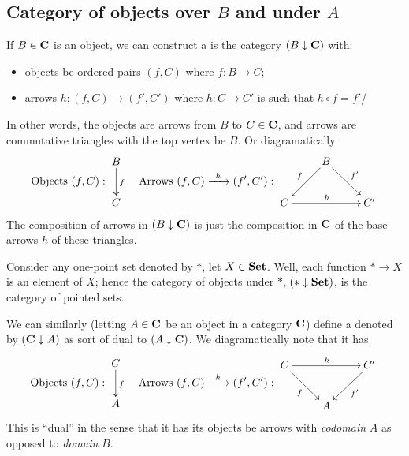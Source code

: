 
\subsection{Category of objects over $B$ and under $A$}
If $B\in\mathbf{C}$ is an object, we can construct a 
is the category $(B\downarrow{}\mathbf{C})$ with:
\begin{itemize}
\item objects be ordered pairs $(f,C)$ where $f:B\to{}C$;
\item arrows $h:(f,C)\to(f',C')$ where $h:C\to{}C'$ is such that $h\circ{}f=f'$/
\end{itemize}
In other words, the objects are arrows from $B$ to $C\in\mathbf{C}$,
and arrows are commutative triangles with the top vertex be
$B$. Or diagramatically
\begin{equation}%
\text{Objects }(f,C):\vcenter{\xymatrix{
B\ar[d]^{f}\\
C
}}\quad
\text{Arrows }(f,C)\xrightarrow{\;\;h\;\;}(f',C'):
\vcenter{\xymatrix{
& \ar[dl]_{f}B\ar[dr]^{f'}&\\
C\ar[rr]^{h}&&C'
}}
\end{equation}
The composition of arrows in $(B\downarrow\mathbf{C})$ is just the
composition in $\mathbf{C}$ of the base arrows $h$ of these triangles.

\begin{ex}
Consider any one-point set denoted by $*$, let
$X\in\mathbf{Set}$. Well, each function $*\to{}X$ is an element of
$X$; hence the category of objects under $*$,
$(*\downarrow\mathbf{Set})$, is the category of pointed sets.
\end{ex}

We can similarly (letting $A\in\mathbf{C}$ be an object in a category
$\mathbf{C}$) define a  denoted
by $(\mathbf{C}\downarrow{}A)$ as sort of dual to
$(A\downarrow\mathbf{C})$. We diagramatically note that it has
\begin{equation}%
\text{Objects }(f,C):\vcenter{\xymatrix{
C\ar[d]^{f}\\
A
}}\quad
\text{Arrows }(f,C)\xrightarrow{\;\;h\;\;}(f',C'):
\vcenter{\xymatrix{
C\ar[dr]_{f}\ar[rr]^{h}&&\ar[dl]^{f'}C'\\
&A&
}}
\end{equation}
This is ``dual'' in the sense that it has its objects be arrows
with \emph{codomain} $A$ as opposed to \emph{domain} $B$.

